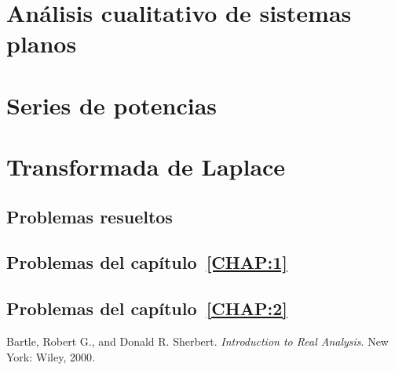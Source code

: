 \documentclass[a4paper, 10pt, openany]{book}
\begin{document}
\chapter{Análisis cualitativo de sistemas planos}
\label{CHAP:4}


\chapter{Series de potencias}
\label{CHAP:5}


\chapter{Transformada de Laplace}
\label{CHAP:6}


\begin{appendices}

\chapter{Problemas resueltos}

\section{Problemas del capítulo~\ref{CHAP:1}}


\section{Problemas del capítulo~\ref{CHAP:2}}


\end{appendices}

\backmatter

\listoffigures

\listoftables

\begin{thebibliography}{1}
		Bartle, Robert G., and Donald R. Sherbert.
		\textit{Introduction to Real Analysis}. 
		New York: Wiley, 2000. 
\end{thebibliography}
\end{document}
